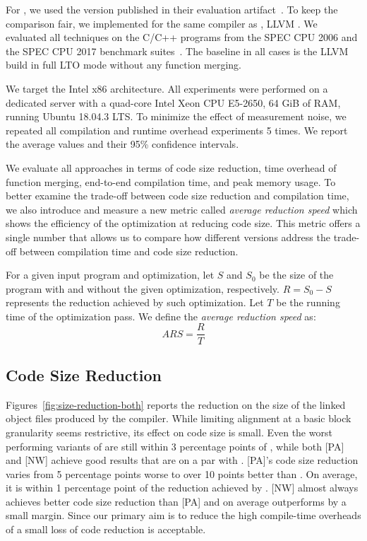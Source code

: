 For \SOAName, we used the version published in their evaluation artifact~\cite{SalSSA}. To keep the comparison fair, we implemented {\ProjName} for the same compiler as \SOAName, LLVM . We evaluated all techniques on the C/C++ programs from the SPEC CPU 2006 and the SPEC CPU 2017 benchmark suites~\cite{spec}. The baseline in all cases is the LLVM build in full LTO mode without any function merging.

We target the Intel x86 architecture.
All experiments were performed on a dedicated server with a quad-core Intel Xeon CPU E5-2650, 64 GiB of RAM, running Ubuntu 18.04.3 LTS. To minimize the effect of measurement noise, we repeated all compilation and runtime overhead experiments 5 times. We report the average values and their 95\% confidence intervals.

We evaluate all approaches in terms of code size reduction, time overhead of function merging, end-to-end compilation time, and peak memory usage. To better examine the trade-off between code size reduction and compilation time, we also introduce and measure a new metric called \textit{average reduction speed} which shows the efficiency of the optimization at reducing code size. This metric offers a single number that allows us to compare how different versions address the trade-off between compilation time and code size reduction.

\begin{definition}
For a given input program and optimization, let $S$ and $S_0$ be the size of the program with and without the given optimization, respectively.
$R = S_0 - S$ represents the reduction achieved by such optimization.
Let $T$ be the running time of the optimization pass.
We define the \textit{average reduction speed} as:
\[
   ARS = \frac{R}{T}
\]  
\end{definition}

\subsection{Code Size Reduction} \label{sec:eval:size}

Figures~\ref{fig:size-reduction-both} reports the reduction on the size of the linked object files produced by the compiler.
While limiting alignment at a basic block granularity seems restrictive, its effect on code size is small. Even the worst performing variants of {\ProjName} are still within 3 percentage points of {\SOAName}, while both [PA] and [NW] achieve good results that are on a par with {\SOAName}. [PA]'s code size reduction varies from 5 percentage points worse to over 10 points better than {\SOAName}. On average, it is within 1 percentage point of the reduction achieved by {\SOAName}. [NW] almost always achieves better code size reduction than [PA] and on average outperforms {\SOAName} by a small margin. Since our primary aim is to reduce the high compile-time overheads of {\SOAName}
a small loss of code reduction is acceptable. 

